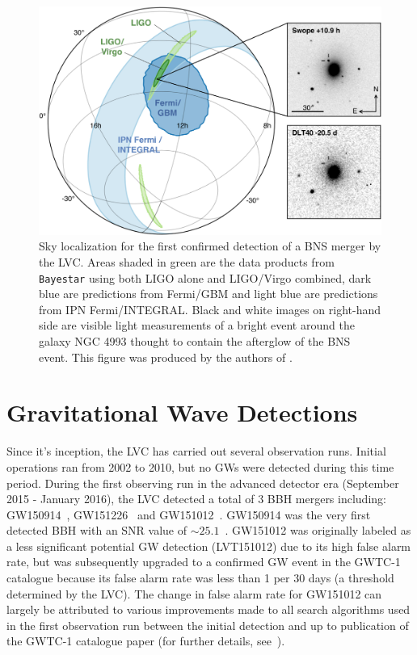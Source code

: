 \begin{figure}
    \centering
    \includegraphics[width=\linewidth]{figures/GW170817_skymap.jpg}
    \caption[Sky localization for the first confirmed detection of a \ac{BNS} merger by the \ac{LVC}.]{Sky localization for the first confirmed detection of a \ac{BNS} merger by the \ac{LVC}. Areas shaded in green are the data products from \texttt{Bayestar} using both \ac{LIGO} alone and \ac{LIGO}/Virgo combined, dark blue are predictions from Fermi/GBM and light blue are predictions from IPN Fermi/INTEGRAL. Black and white images on right-hand side are visible light measurements of a bright event around the galaxy NGC 4993 thought to contain the afterglow of the \ac{BNS} event. This figure was produced by the authors of \cite{2017arXiv171005833L}.}
    \label{fig:GW170817_skylocalization}
\end{figure}

\section{Gravitational Wave Detections}

%
%

Since it's inception, the \ac{LVC} has carried out several observation runs. Initial operations ran from 2002 to 2010, but no \ac{GW}s were detected during this time period. During the first observing run in the advanced detector era (September 2015 - January 2016), the 
\ac{LVC} detected a total of $3$ \ac{BBH} mergers 
including: GW150914~\cite{PhysRevLett.116.061102}, 
GW151226~\cite{PhysRevLett.116.241103} and 
GW151012~\cite{2010.14527}. GW150914 was the very first detected \ac{BBH} with
an \ac{SNR} value of $\sim 25.1$~\cite{0264-9381-33-21-215004}. GW151012 was originally labeled as a less significant potential GW detection 
(LVT151012) due to its 
high false alarm rate, but was subsequently upgraded to a 
confirmed \ac{GW} event in the GWTC-1 catalogue \cite{1811.12907} because its false alarm rate was less than 1 per 30 days (a threshold determined by the \ac{LVC}). The change in false alarm rate 
for GW151012 can largely be attributed to various improvements made to 
all search algorithms used in the first observation run  
between the initial detection and up to publication 
of the GWTC-1 catalogue paper (for further details, see~\cite{1811.12907,
PhysRevD.102.062003}).

